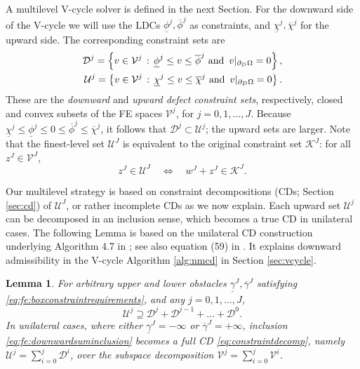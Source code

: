 \documentclass[letterpaper,final,12pt,reqno]{amsart}
\theoremstyle{cstyle}
\newtheorem{lemma}[theorem]{Lemma}
\theoremstyle{cstyle*}
\theoremstyle{dstyle}
\numberwithin{equation}{section}
\numberwithin{figure}{section}
\numberwithin{table}{section}
\numberwithin{theorem}{section}
\newcommand{\cV}{\mathcal{V}}
\begin{document}
A multilevel V-cycle solver is defined in the next Section.  For the downward side of the V-cycle we will use the LDCs $\underline{\phi}^j,\overline{\phi}^j$ as constraints, and $\underline{\chi}^j,\overline{\chi}^j$ for the upward side.  The corresponding constraint sets are
\begin{align}
\mathcal{D}^j = \left\{v \in \mathcal{V}^j \,:\, \underline{\phi}^j \le v \le \overline{\phi}^j \text{ and } \, v|_{\partial_D\Omega} = 0\right\}, \label{eq:fe:constraintsets} \\
\mathcal{U}^j = \left\{v \in \mathcal{V}^j \,:\, \underline{\chi}^j \le v \le \overline{\chi}^j \text{ and } \, v|_{\partial_D\Omega} = 0\right\}. \notag
\end{align}
These are the \emph{downward} and \emph{upward defect constraint sets}, respectively, closed and convex subsets of the FE spaces $\mathcal{V}^j$, for $j=0,1,\dots,J$.  Because $\underline{\chi}^j \le \underline{\phi}^j \le 0 \le \overline{\phi}^j \le \overline{\chi}^j$, it follows that $\mathcal{D}^j \subset \mathcal{U}^j$; the upward sets are larger.  Note that the finest-level set $\mathcal{U}^J$ is equivalent to the original constraint set $\mathcal{K}^J$: for all $z^J \in \mathcal{V}^J$,
\begin{equation}
z^J \in \mathcal{U}^J \quad \iff \quad w^J+z^J \in \mathcal{K}^J. \label{eq:fe:finestlevelequivalent}
\end{equation}

Our multilevel strategy is based on constraint decompositions (CDs; Section \ref{sec:cd}) of $\mathcal{U}^J$, or rather incomplete CDs as we now explain.  Each upward set $\mathcal{U}^j$ can be decomposed in an inclusion sense, which becomes a true CD in unilateral cases.  The following Lemma is based on the unilateral CD construction underlying Algorithm 4.7 in \cite{GraeserKornhuber2009}; see also equation (59) in \cite{Tai2003}.  It explains downward admissibility in the V-cycle Algorithm \ref{alg:nmcd} in Section \ref{sec:vcycle}.

\begin{lemma}  \label{lem:downwardadmissibility}  For arbitrary upper and lower obstacles $\underline{\gamma}^J,\overline{\gamma}^J$ satisfying \eqref{eq:fe:boxconstraintrequirements}, and any $j=0,1,\dots,J$,
\begin{equation}
\mathcal{U}^j \supseteq \mathcal{D}^j + \mathcal{D}^{j-1} + \dots + \mathcal{D}^0. \label{eq:fe:downwardsuminclusion}
\end{equation}
In unilateral cases, where either $\underline{\gamma}^J=-\infty$ or $\overline{\gamma}^J=+\infty$, inclusion \eqref{eq:fe:downwardsuminclusion} becomes a full CD \eqref{eq:constraintdecomp}, namely $\mathcal{U}^j=\sum_{i=0}^j \mathcal{D}^i$, over the subspace decomposition $\cV^j=\sum_{i=0}^j \cV^i$.
\end{lemma}
\end{document}
